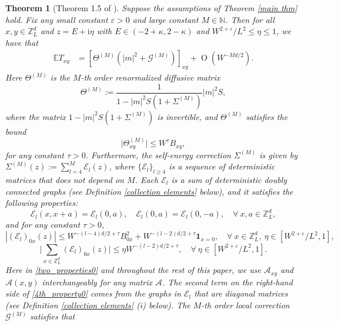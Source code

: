 \documentclass{article}
\newcommand{\1}{\mathds{1}}
\numberwithin{equation}{section}
\newcommand{\be}{\begin{equation}}
\newcommand{\ee}{\end{equation}}
\newcommand{\e}{{\varepsilon}}
\renewcommand{\cal}{\mathcal}
\newcommand{\ii}{\mathrm{i}} %
\renewcommand{\leq}{\leqslant}
\renewcommand{\geq}{\geqslant}
\renewcommand{\le}{\leq}
\renewcommand{\ge}{\geq}
\newcommand{\E}{\mathbb{E}}
\newcommand{\N}{\mathbb{N}}
\newcommand{\Z}{\mathbb{Z}}
\DeclareMathOperator{\OO}{O}
\theoremstyle{plain} %
\newtheorem{theorem}{Theorem}[section]
\theoremstyle{remark}
\newcommand{\cor}{\color{red}}
\newcommand{\wtSdelta}{\Sigma}
\newcommand{\Sele}{{\mathcal E}}
\newcommand{\Selek}{{\mathcal E}}
\newcommand{\hty}[1]{{\cor (ht: #1) }}
\begin{document}
\begin{theorem}[Theorem 1.5 of \cite{PartI_high}] %
	\label{main thm2}
	Suppose the assumptions of Theorem \ref{main thm} hold. %
	Fix any small constant $\e>0$ and large constant $M\in \N$. Then for all $x,y \in \Z_{L}^d$ and $z=E+\ii \eta$ with $E\in (-2+\kappa,2-\kappa)$ and $W^{2+\e}/L^{2}\le \eta\le 1$, we have that %
	\be\label{E_locallaw}
	\begin{split}
		\E T_{xy} &=  \left[  \Theta^{(M)} \left(|m|^2 + \cal G^{(M)} \right)\right]_{xy}  + \OO( W^{-Md/2} ) . %
	\end{split}
	\ee
	Here $\Theta^{(M)}$ is the $M$-th order \emph{renormalized diffusive matrix}
	\be\label{theta_renormal}\Theta^{(M)}:= \frac{1}{1-|m|^2  S\left(1+\wtSdelta^{(M)}\right)}|m|^2S,\ee
	where the matrix $1-|m|^2  S(1+\wtSdelta^{(M)})$ is invertible, and $\Theta^{(M)}$ satisfies the bound
	\be\label{Self_theta} \big|\Theta^{(M)}_{xy} \big| \le W^{\tau}B_{xy}, \ee %
	for any constant $\tau>0$. Furthermore, the \emph{self-energy correction} $\wtSdelta^{(M)}$ is given by $\wtSdelta^{(M)}(z):=\sum_{l=4}^M \Sele_l(z)$, where $\{\Sele_l\}_{l\ge 4}$ is a sequence of deterministic matrices that does not depend on $M$. Each $\Sele_l$ is a sum of deterministic doubly connected graphs (see Definition \ref{collection elements} below), and it satisfies the following properties:  %
	\be\label{two_properties0}
	\Selek_{l} (x, x+a) =  \Selek_{l} (0,a), \quad   \Selek_{l} (0, a) = \Selek_{l}(0,-a), \quad \forall \ x,a\in \Z_L^d,
	\ee 
	and for any constant $\tau>0$,
	\be\label{4th_property0}
	\left|  (\Selek_{l})_{0x}(z) \right| \le  W^{-(l-4)d/2+\tau}B_{0x}^2 + W^{-(l-2)d/2+\tau}\mathbf 1_{x=0}, \quad \forall \ x\in \Z_L^d,\ \eta\in [W^{2+\e}/L^{2}, 1],
	\ee
	\be\label{3rd_property0}
	\Big|\sum_{x\in \Z_L^d} (\Selek_{l})_{0x}(z)\Big|   \le  \eta W^{-(l-2)d/2 +\tau } , \quad \forall  \ \eta\in [W^{2+\e}/L^{2},1].
	\ee
	Here in \eqref{two_properties0} and throughout the rest of this paper, we use $\cal A_{xy}$ and $ \cal A(x,y)$ interchangeably for any matrix $\cal A$. The second term on the right-hand side of \eqref{4th_property0} comes from the graphs in $\Sele_l$ that are diagonal matrices (see Definition \ref{collection elements} (i) below).  The $M$-th order \emph{local correction} $ \cal G^{(M)}$ satisfies that

\end{theorem}
\end{document}
